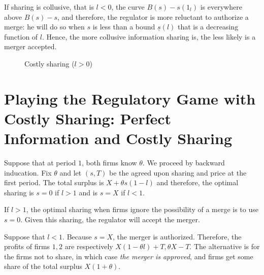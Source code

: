 \documentclass[a4paper]{article}
\renewcommand{\t}{\theta}
\begin{document}
If sharing is collusive, that is $l<0$, the curve $B(s)-s(1_l)$ is everywhere above $B(s)-s$, and therefore, the regulator is more reluctant to authorize a merge: he will do so when $s$ is less than a bound $\underline s(l)$ that is a decreasing function of $l$. Hence, the more collusive information sharing is, the less likely is a merger accepted.

\begin{figure}[h!]
    \centering
    \caption{Costly sharing ($l>0$)}
    \label{fig:l>0}
\end{figure}


\section{Playing the Regulatory Game with Costly Sharing: Perfect Information and Costly Sharing}
Suppose that at period $1$, both firms know $\theta$. We proceed by backward inducation. Fix $\t$ and let $(s,T)$ be the agreed upon sharing and price at the first period. The total surplus is $X+\t s(1-l)$ and therefore, the optimal sharing is $s=0$ if $l> 1$ and is $s=X$ if $l<1$. 

If $l>1$, the optimal sharing when firms ignore the possibility of a merge is to use $s=0$. Given this sharing, the regulator will accept the merger.  

Suppose that $l<1$. Because $s=X$, the merger is authorized. Therefore, the profits of firms $1,2$ are respectively $X(1-\t l)+T,\t X -T$. The alternative is for the firms not to share, in which case \emph{the merger is approved}, and firms get some share of the total surplus $X(1+\t)$. 




\end{document}
